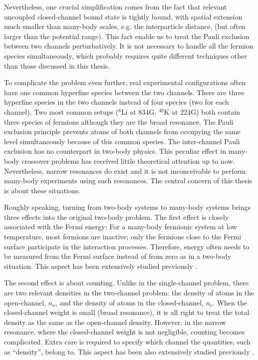   Nevertheless, one crucial simplification comes from  the fact  that relevant uncoupled closed-channel bound state is  tightly bound, with spatial extension much smaller than  many-body scales, e.g. the interparticle distance, (but often larger than the potential range).  This fact enable us to treat the Pauli exclusion between two channels perturbatively. It is not necessary to handle all the  fermion species simultaneously, which probably requires quite different techniques  other than those discussed in this thesis. 

To complicate the problem even further,  real experimental configurations often have one common hyperfine species between the two channels. There are three hyperfine species in the  two channels instead of four species (two for each channel).  Two most common setups (${}^{6}\text{Li}$ at 834G, $^{40}\text{K}$ at 224G) both contain three species of fermions although they are the broad resonance.  The Pauli exclusion principle prevents  atoms of both channels from occupying the same level simultaneously because of this common species.  The inter-channel Pauli exclusion has no counterpart in two-body physics. This peculiar effect  in many-body crossover problems has  received little theoretical attention up to now.    Nevertheless,   narrow resonances do exist \cite{ChinRMP} and it is not  inconceivable to perform many-body experiments using such resonances.  The central concern of this thesis is about these situations. 

Roughly speaking, turning from two-body systems to many-body systems brings three effects into the original two-body problem.  The first effect is closely associated with the Fermi energy:  For a many-body fermionic system at low temperature, most fermions are inactive; only the fermions close to the Fermi surface participate in the interaction processes. Therefore, energy often needs to be measured from the Fermi surface instead of from zero as in a two-body situation. This aspect has been extensively studied previously \cite{GurarieNarrow}.

The second effect is about counting. Unlike in the single-channel problem, there are two relevant densities in the two-channel problem: the density of atoms in the open-channel, $n_{o}$, and the density of atoms in the closed-channel, $n_{c}$. When the closed-channel weight is small (broad resonance), it is all right to treat the total density as the same as the open-channel density.  However, in the narrow resonance, where the closed-channel weight is not negligible, counting becomes complicated.  Extra care is required to specify which channel the  quantities, such as ``density'', belong to.  This aspect has been  also extensively studied previously \cite{GurarieNarrow}.

